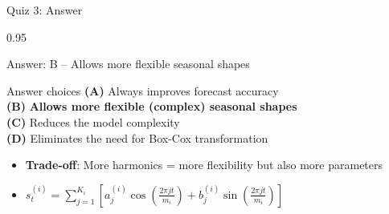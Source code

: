 \documentclass[9pt, aspectratio=169, t]{beamer}
\begin{document}
\begin{frame}{Quiz 3: Answer}
    \begin{cminipage}{0.95\textwidth}
    \begin{exampleblock}{Answer: B -- Allows more flexible seasonal shapes}

    \begin{block}{Answer choices}
        \textcolor{MainBlue}{\textbf{(A)}} Always improves forecast accuracy \incorrect\\[3pt]
        \textcolor{MainBlue}{\textbf{(B)}} \textbf{\textcolor{Forest}{Allows more flexible (complex) seasonal shapes}} \correct\\[3pt]
        \textcolor{MainBlue}{\textbf{(C)}} Reduces the model complexity \incorrect\\[3pt]
        \textcolor{MainBlue}{\textbf{(D)}} Eliminates the need for Box-Cox transformation \incorrect
    \end{block}

        \vspace{0.3cm}

        \begin{itemize}
            \item \textbf{Trade-off}: More harmonics = more flexibility but also more parameters
            \item $s_t^{(i)} = \sum_{j=1}^{K_i} \left[ a_j^{(i)} \cos\left(\frac{2\pi j t}{m_i}\right) + b_j^{(i)} \sin\left(\frac{2\pi j t}{m_i}\right) \right]$
        \end{itemize}
    \end{exampleblock}

    \end{cminipage}
\end{frame}
\end{document}
